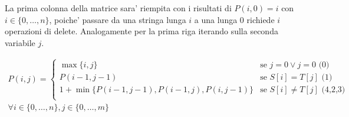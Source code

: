 \documentclass{article}
\begin{document}
La prima colonna della matrice sara' riempita con i risultati di $P(i, 0) = i$
con $i \in \{ 0, \ldots, n \}$, poiche' passare da una stringa lunga $i$ a una
lunga $0$ richiede $i$ operazioni di delete. Analogamente per la prima riga iterando
sulla seconda variabile $j$.

\begin{align*}
  P(i, j) = \begin{cases}
    \max\{i, j\} &\text{se } j = 0 \vee j = 0 \text{ (0)}\\
    P(i-1, j-1) &\text{se } S[i] = T[j] \text{ (1)}\\
    1 + \min\{P(i-1, j-1), P(i-1, j), P(i, j-1)\} &\text{se } S[i] \neq T[j] \text{ (4,2,3)}\\
  \end{cases} \\
  \forall i \in \{ 0, \ldots, n \}, j \in \{ 0, \ldots, m \}
\end{align*}
\end{document}
